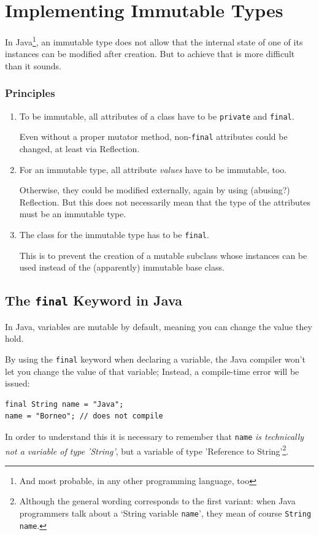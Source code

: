 \section{Implementing Immutable Types}\label{sec:ImmutableTypes}
In Java\footnote{And most probable, in any other programming language, too},  an immutable type does not allow that the internal state of one of its instances can be modified after creation. But to achieve that is more difficult than it sounds.


\subsubsection{Principles}
\begin{enumerate}[label=P\arabic*.]
\item{To be immutable, all attributes of a class have to be \lstinline|private| and \lstinline|final|.

Even without a proper mutator method, non-\lstinline|final| attributes could be changed, at least via Reflection.}

\item{For an immutable type, all attribute \textit{values} have to be immutable, too.

Otherwise, they could be modified externally, again by using (abusing?) Reflection. But this does not necessarily mean that the type of the attributes must be an immutable type.}

\item{The class for the immutable type has to be \lstinline|final|.

This is to prevent the creation of a mutable subclass whose instances can be used instead of the (apparently) immutable base class.}
\end{enumerate}

\subsection{The \lstinline|final| Keyword in Java}
In Java, variables are mutable by default, meaning you can change the value they hold.

By using the \lstinline|final| keyword when declaring a variable, the Java compiler won't let you change the value of that variable; Instead, a compile-time error will be issued:
\begin{lstlisting}
final String name = "Java";
name = "Borneo"; // does not compile
\end{lstlisting}
In order to understand this it is necessary to remember that \lstinline|name| \textit{is technically not a variable of type 'String'}, but a variable of type 'Reference to String'\footnote{Although the general wording corresponds to the first variant: when Java programmers talk about a ‘String variable \lstinline|name|’, they mean of course \lstinline|String name|.}.

